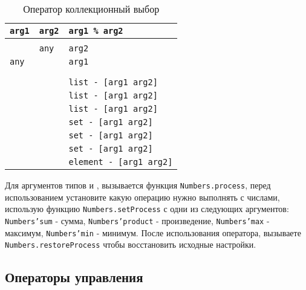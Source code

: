 \begin{table}[htb]
	\caption{Оператор коллекционный выбор}
	\label{centhacktable}
	\begin{tabular}{|l|l|l|}
		\hline
		\texttt{arg1} & \texttt{arg2} & \texttt{arg1 \% arg2}			\\ \hline
		\void{}     & \void{}     & \void{}						\\ \hline
		\void{}     & \texttt{any}  & \texttt{arg2}					\\ \hline
		\texttt{any}  & \void{}     & \texttt{arg1}					\\ \hline
		\integer{}  & \integer{}  & \integer{}					\\ \hline
		\double{}   & \double{}   & \double{}					\\ \hline
		\str{}      & \str{}      & \texttt{list - [arg1 arg2]}	\\ \hline
		\listtype{} & \str{}      & \texttt{list - [arg1 arg2]}	\\ \hline
		\listtype{} & \listtype{} & \texttt{list - [arg1 arg2]}	\\ \hline
		\object{}   & \object{}   & \texttt{set - [arg1 arg2]}	\\ \hline
		\set{}      & \object{}   & \texttt{set - [arg1 arg2]}	\\ \hline
		\set{}      & \set{}      & \texttt{set - [arg1 arg2]}	\\ \hline
		\element{}  & \element{}  & \texttt{element - [arg1 arg2]}\\ \hline
	\end{tabular}
	\vspace{0em}
\end{table}

Для аргументов типов \integer{} и \double{}, вызывается функция \texttt{Numbers.process}, перед использованием установите какую операцию нужно выполнять с числами, использую функцию \texttt{Numbers.setProcess} с одни из следующих аргументов: \texttt{Numbers'sum} - сумма, \texttt{Numbers'product} - произведение, \texttt{Numbers'max} - максимум, \texttt{Numbers'min} - минимум. После использования оператора, вызываете \texttt{Numbers.restoreProcess} чтобы восстановить исходные настройки.

\subsection{Операторы управления}


